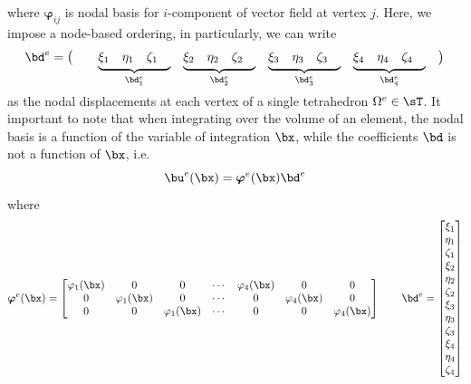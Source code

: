\documentclass[11pt,titlepage]{article}
\renewcommand{\bphi}{\boldsymbol{\varphi}}
\begin{document}
where $\bphi_{ij}$ is nodal basis for $i$-component of vector field at vertex $j$. Here, we impose a node-based ordering, in particularly, we can write
\[
    \bd^e = 
    \begin{pmatrix}
        &&
        \smash[b]{ \underbrace{\begin{matrix} \xi_1 & \eta_1 & \zeta_1 & \end{matrix}}_{\bd^e_1} } & 
        \smash[b]{ \underbrace{\begin{matrix} \xi_2 & \eta_2 & \zeta_2 & \end{matrix}}_{\bd^e_2} } & 
        \smash[b]{ \underbrace{\begin{matrix} \xi_3 & \eta_3 & \zeta_3 & \end{matrix}}_{\bd^e_3} } & 
        \smash[b]{ \underbrace{\begin{matrix} \xi_4 & \eta_4 & \zeta_4 & \end{matrix}}_{\bd^e_4} } & 
    \end{pmatrix} \\
\]
$ $\\
as the nodal displacements at each vertex of a single tetrahedron $\Omega^e \in\sT$. It important to note that when integrating over the volume of an element, the nodal basis is a function of the variable of integration $\bx$, while the coefficients $\bd$ is not a function of $\bx$, i.e. 
\[
    \bu^e(\bx) = \bphi^e(\bx) \bd^e
\]
where 
\[
    \bphi^e(\bx) =    
    \begin{bmatrix}
        \varphi_1(\bx) & 0 & 0 & \cdots & \varphi_4(\bx) & 0 & 0 \\
        0 & \varphi_1(\bx) & 0 & \cdots & 0 & \varphi_4(\bx) & 0 \\
        0 & 0 & \varphi_1(\bx) & \cdots & 0 & 0 & \varphi_4(\bx) \\
    \end{bmatrix}
    \quad\quad
    \bd^e = 
    \begin{bmatrix}
        \xi_1 \\ \eta_1 \\ \zeta_1 \\
        \xi_2 \\ \eta_2 \\ \zeta_2 \\
        \xi_3 \\ \eta_3 \\ \zeta_3 \\
        \xi_4 \\ \eta_4 \\ \zeta_4 \\
    \end{bmatrix}
\]
\end{document}
